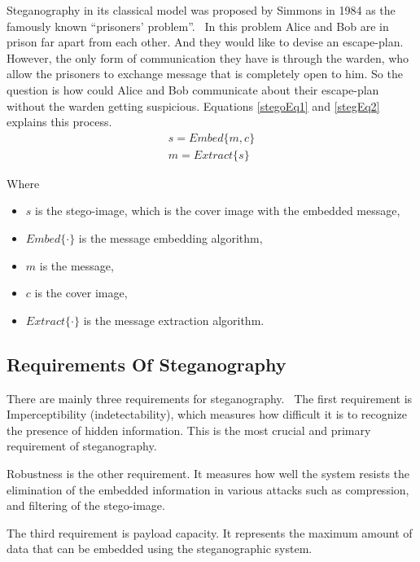 \documentclass[../main/main.tex]{subfiles}
\begin{document}
	Steganography in its classical model was proposed by Simmons in 1984 as the famously known \textquotedblleft prisoners' problem\textquotedblright.~ In this problem Alice and Bob are in prison far apart from each other. And they would like to devise an escape-plan. However, the only form of communication they have is through the warden, who allow the prisoners to exchange message that is completely open to him. So the question is how could Alice and Bob communicate about their escape-plan without the warden getting suspicious. Equations \ref{stegoEq1} and \ref{stegEq2} explains this process. 
	\begin{align}
	\label{stegoEq1}
	s = Embed\{m, c\} \\
	\label{stegEq2} 
	m = Extract\{s\}
	\end{align}
	
	Where
	\begin{itemize}
		\item $s$ is the stego-image, which is the cover image with the embedded message,
		\item $Embed\{ \cdot\}$ is the message embedding algorithm,
		\item $m$ is the message,
		\item $c$ is the cover image,
		\item $Extract\{\cdot\}$ is the message extraction algorithm.
	\end{itemize}
	 
	\subsection{Requirements Of Steganography} \label{reqStego}
	There are mainly three requirements for steganography.~ The first requirement is Imperceptibility (indetectability), which measures how difficult it is to recognize the presence of hidden information. This is the most crucial and primary requirement of steganography.~ 
	
	Robustness is the other requirement. It measures how well the system resists the elimination of the embedded information in various attacks such as compression, and filtering of the stego-image.~
	
	The third requirement is payload capacity. It represents the maximum amount of data that can be embedded using the steganographic system.
	
	
\end{document}
